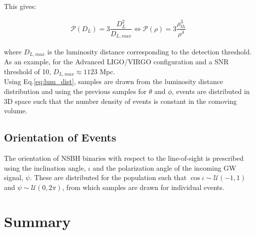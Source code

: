         This gives:

        \begin{align}
            \label{eq:lum_dist}
            \mathcal{P}(D_L) = 3 \dfrac{D_L^2}{D_{L, max}}
                                 \Leftrightarrow
            \mathcal{P}(\rho) = 3 \dfrac{\rho_{th}^3}{\rho^4}
        \end{align}

        where $D_{L, max}$ is the luminosity distance corresponding to the detection
        threshold. As an example, for the Advanced LIGO/VIRGO configuration and a SNR
        threshold of 10, $D_{L, max} \approx 1123$ Mpc.\\
        Using Eq.\ref{eq:lum_dist}, samples are drawn from the luminosity distance
        distribution and using the previous samples for $\theta$ and $\phi$, events are
        distributed in 3D space such that the number density of events is constant in
        the comoving volume.

    \subsection{Orientation of Events}\label{sub:orientation_of_events}

        The orientation of NSBH binaries with respect to the line-of-sight is prescribed
        using the inclination angle, $\iota$ and the polarization angle of the incoming
        GW signal, $\psi$. These are distributed for the population such that $\cos\iota
        \sim \mathcal{U}(-1, 1)$ and $\psi \sim \mathcal{U}(0, 2\pi)$, from which
        samples are drawn for individual events.

\section{Summary}
